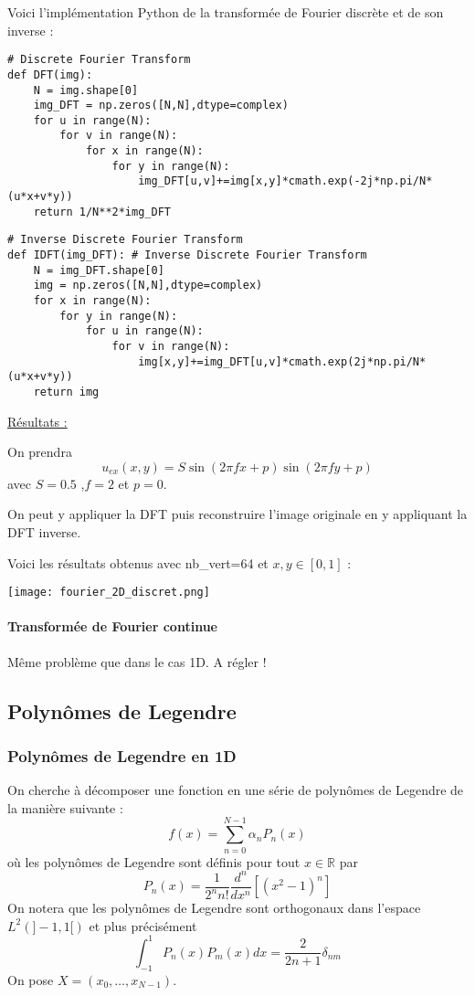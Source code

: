 Voici l'implémentation Python de la transformée de Fourier discrète et de son inverse :

\lstset{style=Python}

\begin{lstlisting}
# Discrete Fourier Transform
def DFT(img):
	N = img.shape[0]
	img_DFT = np.zeros([N,N],dtype=complex)
	for u in range(N):
		for v in range(N):
			for x in range(N):
				for y in range(N):
					img_DFT[u,v]+=img[x,y]*cmath.exp(-2j*np.pi/N*(u*x+v*y))
	return 1/N**2*img_DFT
\end{lstlisting}
\begin{lstlisting}
# Inverse Discrete Fourier Transform
def IDFT(img_DFT): # Inverse Discrete Fourier Transform
	N = img_DFT.shape[0]
	img = np.zeros([N,N],dtype=complex)
	for x in range(N):
		for y in range(N):
			for u in range(N):
				for v in range(N):
					img[x,y]+=img_DFT[u,v]*cmath.exp(2j*np.pi/N*(u*x+v*y))
	return img
\end{lstlisting}

\underline{Résultats :}

On prendra
$$u_{ex}(x,y)=S\sin(2\pi fx + p)\sin(2\pi fy + p)$$
avec $S=0.5$ ,$f=2$ et $p=0$.

On peut y appliquer la DFT puis reconstruire l'image originale en y appliquant la DFT inverse. 

Voici les résultats obtenus avec nb\_vert=64 et $x,y\in[0,1]$ :

\begin{minipage}{\linewidth}
	\centering
	\texttt{[image: fourier\_2D\_discret.png]}
\end{minipage}

\paragraph{Transformée de Fourier continue \\}

Même problème que dans le cas 1D. A régler !

\subsection{Polynômes de Legendre}

\subsubsection{Polynômes de Legendre en 1D}

On cherche à décomposer une fonction en une série de polynômes de Legendre de la manière suivante :
\begin{equation}
	f(x)=\sum_{n=0}^{N-1} \alpha_n P_n(x)
	\label{decomp_1D}
\end{equation}
où les polynômes de Legendre sont définis pour tout $x\in\mathbb{R}$ par
$$P_n(x)=\frac{1}{2^n n!}\frac{d^n}{dx^n}[(x^2-1)^n]$$
On notera que les polynômes de Legendre sont orthogonaux dans l'espace $L^2(]-1,1[)$ et plus précisément
\begin{equation}
	\int_{-1}^1 P_n(x)P_m(x)dx=\frac{2}{2n+1}\delta_{nm} 
	\label{ortho_1D}
\end{equation}
On pose $X=(x_0,\dots,x_{N-1})$.

